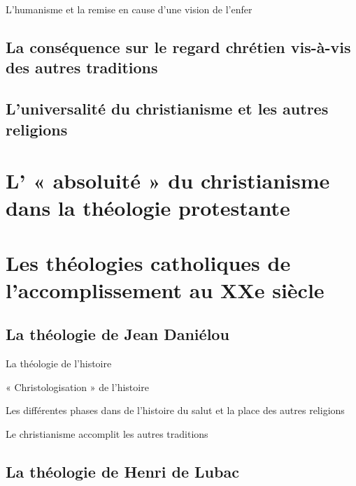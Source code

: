      
      
      L'humanisme et la remise en cause d'une vision de l'enfer
      
  
   
    
    \subsection{La conséquence sur le regard chrétien vis-à-vis des autres
    traditions}
    
   
    
    \subsection{L'universalité du christianisme et les autres religions}
    


  \section{L' « absoluité » du christianisme dans la théologie
  protestante} 
 
  
  \section{Les théologies catholiques de l'accomplissement au XXe siècle}
  



   
    
    \subsection{La théologie de Jean Daniélou}
    

  

     
      
      La théologie de l'histoire
      
     
      
      « Christologisation » de l'histoire
      
     
      
      Les différentes phases dans de l'histoire du salut et la place des
      autres religions
      
     
      
      Le christianisme accomplit les autres traditions
      
  
   
    
    \subsection{La théologie de Henri de Lubac}
    
